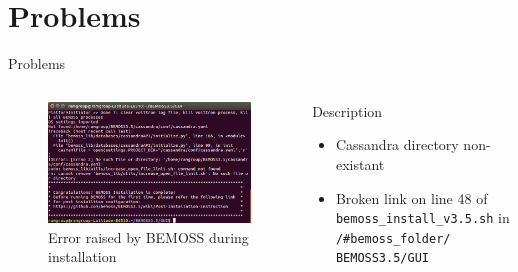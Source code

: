 \documentclass{beamer}
\begin{document}
\section{Problems}

\begin{frame}{Problems}
	\begin{columns}[T]
		\begin{column}{0.5\textwidth}
			\begin{figure}
				\includegraphics[scale=0.2]{../figs/screenshot61019.png}
				\caption{Error raised by BEMOSS during installation}
			\end{figure}
		\end{column}
		\begin{column}{0.5\textwidth}
			\begin{block}{Description}
				\begin{itemize}
					\item Cassandra directory non-existant
					\item Broken link on line 48 of \texttt{bemoss\_install\_v3.5.sh} in \texttt{/\#bemoss\_folder/
					BEMOSS3.5/GUI}
				\end{itemize}
			\end{block}
		\end{column}
	\end{columns}
\end{frame}
\end{document}
